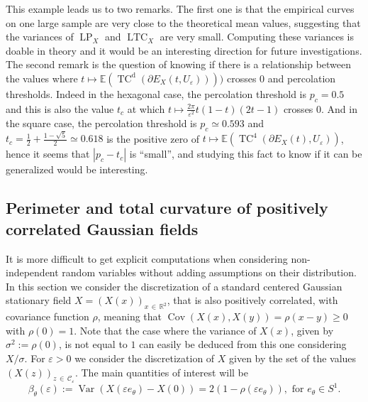 \documentclass[AHL,Unicode,longabstracts,published]{cedram}
\newcommand{\R}{\mathbb{R}}
\newcommand{\E}{\mathbb{E}}
\newcommand{\eps}{\varepsilon}
\DeclareMathOperator{\TC}{TC}
\DeclareMathOperator{\LTC}{LTC}
\DeclareMathOperator{\LP}{LP}
\newcommand{\dd}{\mathrm{d}}
\DeclareMathOperator{\Cov}{Cov}
\DeclareMathOperator{\Var}{Var}
\newcommand{\calC}{\mathcal{C}}
\begin{document}
This example leads us to two remarks. The first one is that the empirical curves on one large sample are very close to the theoretical mean values, suggesting that the variances of $\LP_X$ and $\LTC_X$ are very small. Computing these variances is doable in theory and it would be an interesting direction for future investigations. The second remark is the question of knowing if there is a relationship between the values where $t\mapsto\E(\TC^\dd(\partial E_X(t,U_\eps))))$ crosses $0$ and percolation thresholds. Indeed in the hexagonal case, the percolation threshold is $p_c=0.5$ and this is also the value $t_c$ at which $t\mapsto \tfrac{2\pi}{\eps^2} t(1-t)(2t-1) $ crosses $0$. And in the square case, the percolation threshold is $p_c\simeq 0.593$ and $t_c= \tfrac{1}{2} + \tfrac{1-\sqrt{5}}{2} \simeq 0.618$ is the positive zero of $t\mapsto \E(\TC^4(\partial E_X(t),U_\eps))$, hence it seems that $|p_c-t_c|$ is ``small'', and studying this fact to know if it can be generalized would be interesting.



\subsection{Perimeter and total curvature of positively correlated Gaussian fields}\label{GaussianDiscret:sec}

It is more difficult to get explicit computations when considering non-independent random variables without adding assumptions on their distribution. In this section we consider the discretization of a standard centered Gaussian stationary field $X=\left(X(x)\right)_{x\,\in\,\R^2}$, that is also positively correlated, with covariance function $\rho$, meaning that $\Cov(X(x),X(y))=\rho(x-y)\ge 0$ with $\rho(0)=1$. Note that the case where the variance of $X(x)$, given by $\sigma^2 := \rho(0)$, is not equal to $1$ can easily be deduced from this one considering $X/\sigma$. For $\eps>0$ we consider the discretization of $X$ given by the set of the values $\left(X(z)\right)_{z\,\in\,\calC_\eps}$. The main quantities of interest will be
\begin{equation}\label{beta}
\beta_\theta(\eps) := \Var\left(X(\eps e_\theta)-X(0)\right)=2\left(1-\rho(\eps e_\theta)\right), \text{ for } e_\theta \in S^1.
\end{equation}
\end{document}
